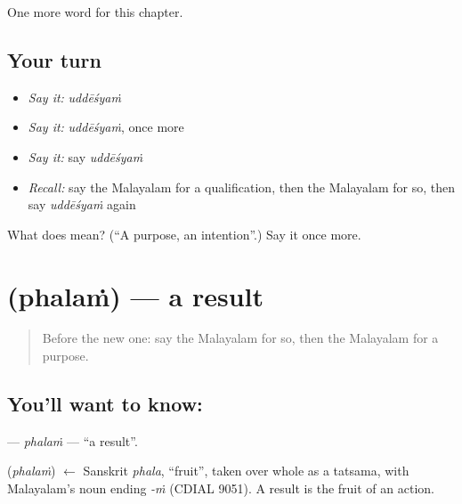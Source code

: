 \begin{grammarlens}[title={What you've built}]
One more word for this chapter.
\end{grammarlens}

\subsection*{Your turn}
\begin{itemize}
\raggedright
  \item \emph{Say it:} \emph{uddēśyaṁ}
  \item \emph{Say it:} \emph{uddēśyaṁ}, once more
  \item \emph{Say it:} say \emph{uddēśyaṁ}
  \item \emph{Recall:} say the Malayalam for a qualification, then the Malayalam for so, then say \emph{uddēśyaṁ} again
\end{itemize}

\begin{tcolorbox}[breakable,colback=teal!4,colframe=teal!35!black,title={Before you move on}]
What does  mean? (\textquotedblleft{}A purpose, an intention\textquotedblright{}.) Say it once more.
\end{tcolorbox}
\section[\texorpdfstring{\ml{ഫലം} (phalaṁ)}{ഫലം (phalaṁ)}]{ (phalaṁ) — a result}

\label{lesson:ML-C144-phalam}



\begin{quote}
Before the new one: say the Malayalam for so, then the Malayalam for a purpose.
\end{quote}

\subsection*{You'll want to know: }
\textbf{} — \emph{phalaṁ} — \textquotedblleft{}a result\textquotedblright{}.

\begin{cousinweb}
\textbf{} (\emph{phalaṁ}) $\leftarrow$ Sanskrit \emph{phala}, \textquotedblleft{}fruit\textquotedblright{}, taken over whole as a tatsama, with Malayalam's noun ending \emph{-ṁ} (CDIAL 9051). A result is the fruit of an action.
\end{cousinweb}

